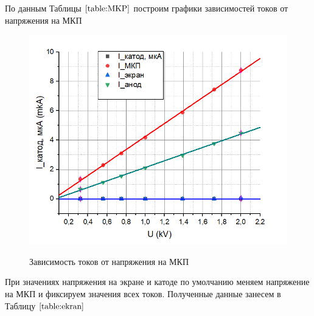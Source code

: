 \documentclass[a4paper,12pt]{article}
\begin{document}
По данным Таблицы $\ref{table:MKP}$ построим графики зависимостей токов от напряжения на МКП

\begin{figure}[h!]
	\begin{center}
	\includegraphics[scale=1]{2}
	\label{graph:MKP}
	\caption{Зависимость токов от напряжения на МКП}
	\end{center}
\end{figure}

\newpage

При значениях напряжения на экране и катоде по умолчанию меняем напряжение на МКП и фиксируем значения всех токов. Полученные данные занесем в Таблицу $\ref{table:ekran}$
\end{document}
